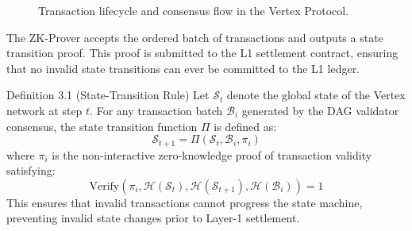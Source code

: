 \documentclass[10pt]{article}
\begin{document}
\begin{figure}[H]
\centering
{}
\caption{Transaction lifecycle and consensus flow in the Vertex Protocol.}
\label{fig:flow}
\end{figure}

The ZK-Prover accepts the ordered batch of transactions and outputs a state transition proof. This proof is submitted to the L1 settlement contract, ensuring that no invalid state transitions can ever be committed to the L1 ledger.

\begin{modelbox}{Definition 3.1 (State-Transition Rule)}
Let $\mathcal{S}_t$ denote the global state of the Vertex network at step $t$. For any transaction batch $\mathcal{B}_i$ generated by the DAG validator consensus, the state transition function $\Pi$ is defined as:
\begin{equation}
\mathcal{S}_{t+1} = \Pi(\mathcal{S}_t, \mathcal{B}_i, \pi_i)
\end{equation}
where $\pi_i$ is the non-interactive zero-knowledge proof of transaction validity satisfying:
\begin{equation}
\text{Verify}(\pi_i, \mathcal{H}(\mathcal{S}_t), \mathcal{H}(\mathcal{S}_{t+1}), \mathcal{H}(\mathcal{B}_i)) = 1
\end{equation}
This ensures that invalid transactions cannot progress the state machine, preventing invalid state changes prior to Layer-1 settlement.
\end{modelbox}
\end{document}
